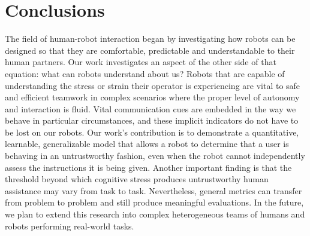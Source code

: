 \documentclass{sig-alternate}
\begin{document}



\section{Conclusions}

The field of human-robot interaction began by investigating how robots
can be designed so that they are comfortable, predictable and
understandable to their human partners.  Our work investigates an
aspect of the other side of that equation: what can robots understand
about us?  Robots that are capable of understanding the stress or
strain their operator is experiencing are vital to safe and efficient
teamwork in complex scenarios where the proper level of autonomy and
interaction is fluid.  Vital communication cues are embedded in the
way we behave in particular circumstances, and these implicit
indicators do not have to be lost on our robots.  Our work's
contribution is to demonstrate a quantitative, learnable,
generalizable model that allows a robot to determine that a user is
behaving in an untrustworthy fashion, even when the robot cannot
independently assess the instructions it is being given.  Another
important finding is that the threshold beyond which cognitive stress
produces untrustworthy human assistance may vary from task to task.
Nevertheless, general metrics can transfer from problem to problem and
still produce meaningful evaluations.  In the future, we plan to
extend this research into complex heterogeneous teams of humans and
robots performing real-world tasks.
\end{document}
